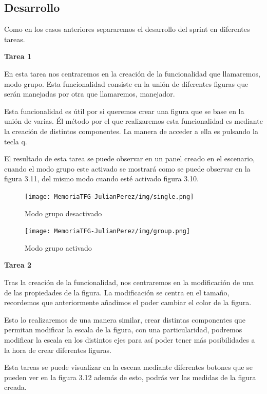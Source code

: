\documentclass[a4paper, 12pt]{book}
\begin{document}
\subsection{Desarrollo}
Como en los casos anteriores separaremos el desarrollo del sprint en diferentes tareas.

\textbf{Tarea 1}

En esta tarea nos centraremos en la creación de la funcionalidad que llamaremos, modo grupo. Esta funcionalidad consiste en la unión de diferentes figuras que serán manejadas por otra que llamaremos, manejador. 

Esta funcionalidad es útil por si queremos crear una figura que se base en la unión de varias. Él método por el que realizaremos esta funcionalidad es mediante la creación de distintos componentes. La manera de acceder a ella es pulsando la tecla q. 

El resultado de esta tarea se puede observar en un panel creado en el escenario, cuando el modo grupo este activado se mostrará como se puede observar en la figura 3.11, del mismo modo cuando esté activado figura 3.10.

\begin{figure}[H]
  \centering
  \begin{minipage}[b]{0.4\textwidth}
 \texttt{[image: MemoriaTFG-JulianPerez/img/single.png]}
  \caption{Modo grupo desactivado}\label{single}
  \end{minipage}
  \hfill
  \begin{minipage}[b]{0.4\textwidth}
  \texttt{[image: MemoriaTFG-JulianPerez/img/group.png]}
  \caption{Modo grupo activado}\label{scrum}
  \end{minipage}
\end{figure}

\textbf{Tarea 2}

Tras la creación de la funcionalidad, nos centraremos en la modificación de una de las propiedades de la figura. La modificación se centra en el tamaño, recordemos que anteriormente añadimos el poder cambiar el color de la figura.

Esto lo realizaremos de una manera similar, crear distintas componentes que permitan modificar la escala de la figura, con una particularidad, podremos modificar la escala en los distintos ejes para así poder tener más posibilidades a la hora de crear diferentes figuras. 

Esta tareas se puede visualizar en la escena mediante diferentes botones que se pueden ver en la figura 3.12 además de esto, podrás ver las medidas de la figura creada.
\end{document}

